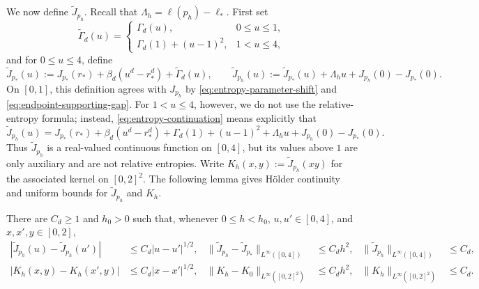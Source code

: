We now define $\widetilde J_{p_h}$.  Recall that
$\Lambda_h=\ell(p_h)-\ell_*$.  First set
\[
  \widetilde\Gamma_d(u)=
  \begin{cases}
    \Gamma_d(u),&0\le u\le1,\\
    \Gamma_d(1)+(u-1)^2,&1<u\le4,
  \end{cases}
\]
and for $0 \le u \le 4$, define
\begin{equation}\label{eq:entropy-continuation}
  \widetilde J_{p_*}(u)
  :=J_{p_*}(r_*)+\beta_d(u^d-r_*^d)
  +\widetilde\Gamma_d(u),
  \qquad
  \widetilde J_{p_h}(u)
  :=\widetilde J_{p_*}(u)+\Lambda_hu+J_{p_h}(0)-J_{p_*}(0).
\end{equation}
On $[0,1]$, this definition agrees with $J_{p_h}$ by
\eqref{eq:entropy-parameter-shift} and \eqref{eq:endpoint-supporting-gap}.  For
$1<u\le4$, however, we do not use the relative-entropy formula; instead,
\eqref{eq:entropy-continuation} means explicitly that
\[
  \widetilde J_{p_h}(u)
  =J_{p_*}(r_*)+\beta_d(u^d-r_*^d)+\Gamma_d(1)+(u-1)^2
   +\Lambda_hu+J_{p_h}(0)-J_{p_*}(0).
\]
Thus $\widetilde J_{p_h}$ is a real-valued continuous function on $[0,4]$,
but its values above $1$ are only auxiliary and are not relative entropies.
Write
$K_h(x,y):=\widetilde J_{p_h}(xy)$ for the associated kernel on $[0,2]^2$.
The following lemma gives H\"older continuity and uniform bounds for
$\widetilde J_{p_h}$ and $K_h$.
\begin{lemma}
\label{lem:continuation-kernel-bounds}
There are $C_d\ge1$ and $h_0>0$ such that, whenever $0\le h<h_0$,
$u,u'\in[0,4]$, and $x,x',y\in[0,2]$,
\begin{equation}\label{eq:continuation-kernel-bounds}
  \begin{aligned}
    |\widetilde J_{p_h}(u)-\widetilde J_{p_h}(u')|&\le C_d|u-u'|^{1/2},
    & \|\widetilde J_{p_h}-\widetilde J_{p_*}\|_{L^\infty([0,4])}&\le C_dh^2,
    & \|\widetilde J_{p_h}\|_{L^\infty([0,4])}&\le C_d,
    \\
    |K_h(x,y)-K_h(x',y)| &\le C_d|x-x'|^{1/2},
    & \|K_h-K_0\|_{L^\infty([0,2]^2)}&\le C_dh^2,
    & \|K_h\|_{L^\infty([0,2]^2)}&\le C_d.
  \end{aligned}
\end{equation}
\end{lemma}

